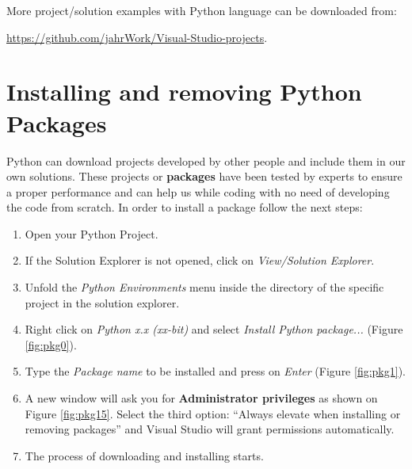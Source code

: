 \begin{IN}
    More project/solution examples with Python language can be downloaded from:
    
     \url{https://github.com/jahrWork/Visual-Studio-projects}.
\end{IN}

    \section{Installing and removing Python Packages}

Python can download projects developed by other people and include them in our own solutions. These projects or \textbf{packages} have been tested by experts to ensure a proper performance and can help us while coding with no need of developing the code from scratch. In order to install a package follow the next steps:

\newpage
\begin{enumerate}[nosep]
	\item Open your Python Project.
	\item If the Solution Explorer is not opened, click on \textit{View/Solution Explorer}.
	\item Unfold the \textit{Python Environments} menu inside the directory of the specific project in the solution explorer.
	\item Right click on \textit{Python x.x (xx-bit)} and select \textit{Install Python package...} (Figure \ref{fig:pkg0}).
	\item Type the \textit{Package name} to be installed and press on \textit{Enter} (Figure \ref{fig:pkg1}).
	\item A new window will ask you for \textbf{Administrator privileges} as shown on Figure \ref{fig:pkg15}. Select the third option: ``Always elevate when installing or removing packages'' and Visual Studio will grant permissions automatically.
    \item The process of downloading and installing starts.
\end{enumerate}

